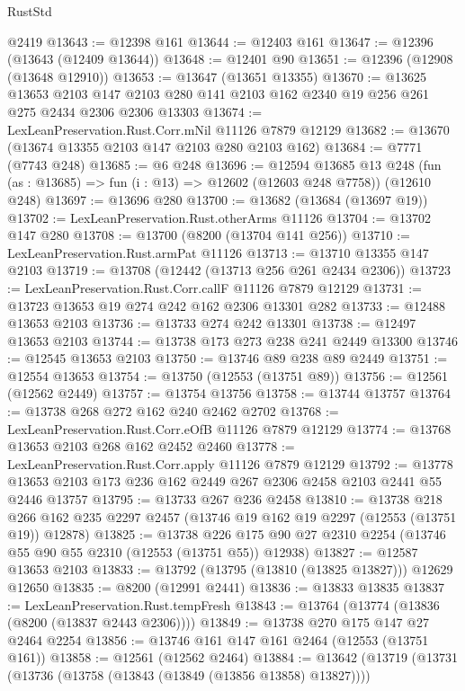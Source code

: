 \begin{lexlean}{RustStd}
\begin{coremodule}
    @2419
@13643 := @12398 @161
@13644 := @12403 @161
@13647 := @12396 (@13643 (@12409 @13644))
@13648 := @12401 @90
@13651 := @12396 (@12908 (@13648 @12910))
@13653 := @13647 (@13651 @13355)
@13670 := @13625
    @13653
    @2103
    @147
    @2103
    @280
    @141
    @2103
    @162
    @2340
    @19
    @256
    @261
    @275
    @2434
    @2306
    @2306
    @13303
@13674 := LexLeanPreservation.Rust.Corr.mNil @11126 @7879 @12129
@13682 := @13670 (@13674 @13355 @2103 @147 @2103 @280 @2103 @162)
@13684 := @7771 (@7743 @248)
@13685 := @6 @248
@13696 := @12594
    @13685
    @13
    @248
    (fun (as : @13685) => fun (i : @13) => @12602 (@12603 @248 @7758))
    (@12610 @248)
@13697 := @13696 @280
@13700 := @13682 (@13684 (@13697 @19))
@13702 := LexLeanPreservation.Rust.otherArms @11126
@13704 := @13702 @147 @280
@13708 := @13700 (@8200 (@13704 @141 @256))
@13710 := LexLeanPreservation.Rust.armPat @11126
@13713 := @13710 @13355 @147 @2103
@13719 := @13708 (@12442 (@13713 @256 @261 @2434 @2306))
@13723 := LexLeanPreservation.Rust.Corr.callF @11126 @7879 @12129
@13731 := @13723 @13653 @19 @274 @242 @162 @2306 @13301 @282
@13733 := @12488 @13653 @2103
@13736 := @13733 @274 @242 @13301
@13738 := @12497 @13653 @2103
@13744 := @13738 @173 @273 @238 @241 @2449 @13300
@13746 := @12545 @13653 @2103
@13750 := @13746 @89 @238 @89 @2449
@13751 := @12554 @13653
@13754 := @13750 (@12553 (@13751 @89))
@13756 := @12561 (@12562 @2449)
@13757 := @13754 @13756
@13758 := @13744 @13757
@13764 := @13738 @268 @272 @162 @240 @2462 @2702
@13768 := LexLeanPreservation.Rust.Corr.eOfB @11126 @7879 @12129
@13774 := @13768 @13653 @2103 @268 @162 @2452 @2460
@13778 := LexLeanPreservation.Rust.Corr.apply @11126 @7879 @12129
@13792 := @13778 @13653 @2103 @173 @236 @162 @2449 @267 @2306 @2458 @2103 @2441 @55 @2446 @13757
@13795 := @13733 @267 @236 @2458
@13810 := @13738
    @218
    @266
    @162
    @235
    @2297
    @2457
    (@13746 @19 @162 @19 @2297 (@12553 (@13751 @19)) @12878)
@13825 := @13738
    @226
    @175
    @90
    @27
    @2310
    @2254
    (@13746 @55 @90 @55 @2310 (@12553 (@13751 @55)) @12938)
@13827 := @12587 @13653 @2103
@13833 := @13792 (@13795 (@13810 (@13825 @13827))) @12629 @12650
@13835 := @8200 (@12991 @2441)
@13836 := @13833 @13835
@13837 := LexLeanPreservation.Rust.tempFresh
@13843 := @13764 (@13774 (@13836 (@8200 (@13837 @2443 @2306))))
@13849 := @13738 @270 @175 @147 @27 @2464 @2254
@13856 := @13746 @161 @147 @161 @2464 (@12553 (@13751 @161))
@13858 := @12561 (@12562 @2464)
@13884 := @13642
    (@13719
      (@13731
        (@13736 (@13758 (@13843 (@13849 (@13856 @13858) @13827))))

\end{coremodule}
\end{lexlean}
